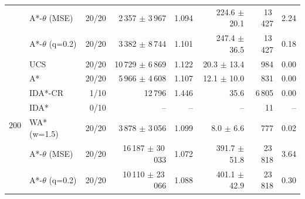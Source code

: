 \begin{tabular}{llrrrrrr}
 & A*-$\theta$ (MSE) & 20/20 & 2\,357 $\pm$ 3\,967 & 1.094 & 224.6 $\pm$ 20.1 & 13\,427 & 2.24 \\
 & A*-$\theta$ (q=0.2) & 20/20 & 3\,382 $\pm$ 8\,744 & 1.101 & 247.4 $\pm$ 36.5 & 13\,427 & 0.18 \\
\midrule
\multirow{7}{*}{200} & UCS & 20/20 & 10\,729 $\pm$ 6\,869 & 1.122 & 20.3 $\pm$ 13.4 & 984 & 0.00 \\
 & A* & 20/20 & 5\,966 $\pm$ 4\,608 & 1.107 & 12.1 $\pm$ 10.0 & 831 & 0.00 \\
 & IDA*-CR & 1/10 & 12\,796 & 1.446 & 35.6 & 6\,805 & 0.00 \\
 & IDA* & 0/10 & -- & -- & -- & 11 & -- \\
 & WA* (w=1.5) & 20/20 & 3\,878 $\pm$ 3\,056 & 1.099 & 8.0 $\pm$ 6.6 & 777 & 0.02 \\
 & A*-$\theta$ (MSE) & 20/20 & 16\,187 $\pm$ 30\,033 & 1.072 & 391.7 $\pm$ 51.8 & 23\,818 & 3.64 \\
 & A*-$\theta$ (q=0.2) & 20/20 & 10\,110 $\pm$ 23\,066 & 1.088 & 401.1 $\pm$ 42.9 & 23\,818 & 0.30 \\
\bottomrule
\end{tabular}
